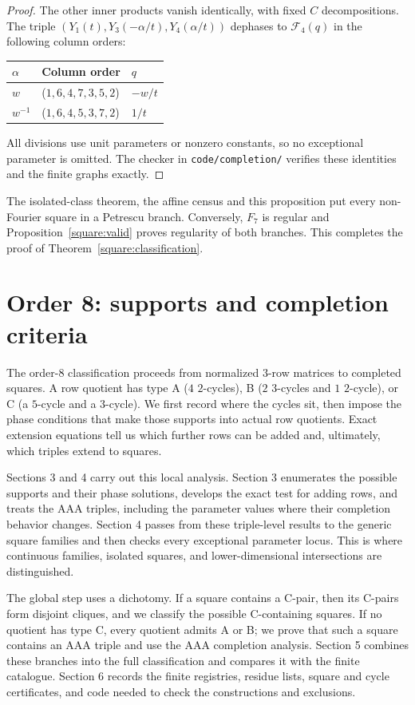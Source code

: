 \documentclass[11pt,a4paper]{article}
\theoremstyle{plain}
\theoremstyle{definition}
\numberwithin{equation}{section}
\begin{document}
\begin{proof}
The other inner products vanish identically, with fixed $C$ decompositions. The triple $(Y_1(t),Y_3(-\alpha/t),Y_4(\alpha/t))$ dephases to $\mathcal F_4(q)$ in the following column orders:
\begin{center}\begin{tabular}{@{}lll@{}}\toprule
$\alpha$ & Column order & $q$\\\midrule
$w$ &($1,6,4,7,3,5,2$)&$-w/t$\\
$w^{-1}$ &($1,6,4,5,3,7,2$)&$1/t$\\\bottomrule
\end{tabular}\end{center}
All divisions use unit parameters or nonzero constants, so no exceptional parameter is omitted. The checker in \texttt{code/completion/} verifies these identities and the finite graphs exactly.
\end{proof}
The isolated-class theorem, the affine census and this proposition put every non-Fourier square in a Petrescu branch. Conversely, $F_7$ is regular and Proposition~\ref{square:valid} proves regularity of both branches. This completes the proof of Theorem~\ref{square:classification}.

\section{Order 8: supports and completion criteria}\label{sec:N8part1}

The order-$8$ classification proceeds from normalized $3$-row matrices to completed squares. A row quotient has type A ($4$ $2$-cycles), B ($2$ $3$-cycles and $1$ $2$-cycle), or C (a $5$-cycle and a $3$-cycle). We first record where the cycles sit, then impose the phase conditions that make those supports into actual row quotients. Exact extension equations tell us which further rows can be added and, ultimately, which triples extend to squares.

Sections 3 and 4 carry out this local analysis. Section 3 enumerates the possible supports and their phase solutions, develops the exact test for adding rows, and treats the AAA triples, including the parameter values where their completion behavior changes. Section 4 passes from these triple-level results to the generic square families and then checks every exceptional parameter locus. This is where continuous families, isolated squares, and lower-dimensional intersections are distinguished.

The global step uses a dichotomy. If a square contains a C-pair, then its C-pairs form disjoint cliques, and we classify the possible C-containing squares. If no quotient has type C, every quotient admits A or B; we prove that such a square contains an AAA triple and use the AAA completion analysis. Section 5 combines these branches into the full classification and compares it with the finite catalogue. Section 6 records the finite registries, residue lists, square and cycle certificates, and code needed to check the constructions and exclusions.
\end{document}
